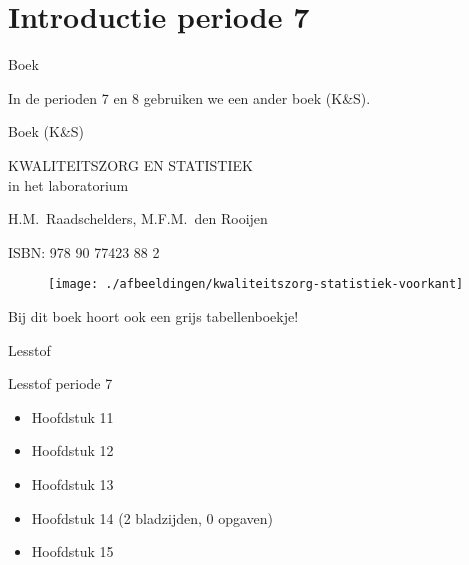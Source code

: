 \section{Introductie periode 7}

% 
% 
% 
% 
% 


 \begin{frame}{Boek}

In de perioden 7 en 8 gebruiken we een ander boek (K\&S). 


\begin{block}{Boek (K\&S)}
\begin{minipage}{.70\textwidth} %
KWALITEITSZORG EN STATISTIEK\\
in het laboratorium

\bigskip
H.M.~Raadschelders, M.F.M.~den Rooijen

\bigskip
ISBN: 978 90 77423 88 2
\vfill
\end{minipage} %
\begin{minipage}{.25\textwidth} %
\begin{figure}
\texttt{[image: ./afbeeldingen/kwaliteitszorg-statistiek-voorkant]} 
\end{figure}
\end{minipage}
\end{block}

Bij dit boek hoort ook een grijs tabellenboekje!

\end{frame}


\begin{frame}{Lesstof}

\begin{block}{Lesstof periode 7}
\begin{itemize}
 \item Hoofdstuk 11
 \item Hoofdstuk 12
 \item Hoofdstuk 13
 \item Hoofdstuk 14 (2 bladzijden, 0 opgaven)
 \item Hoofdstuk 15
\end{itemize}
\end{block}
\end{frame}


